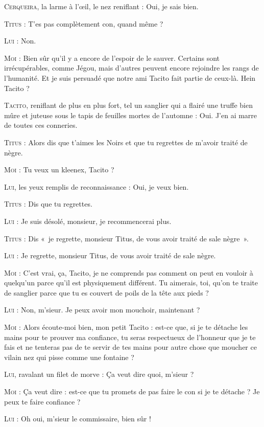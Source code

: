 \begin{dialogue}
\textsc{Cerqueira}, la larme à l’œil, le nez reniflant : Oui, je sais bien.

\textsc{Titus} : T’es pas complètement con, quand même ?

\textsc{Lui} : Non.

\textsc{Moi} : Bien sûr qu’il y a encore de l’espoir de le sauver. Certains sont irrécupérables, comme Jégou, mais d’autres peuvent encore rejoindre les rangs de l’humanité. Et je suis persuadé que notre ami Tacito fait partie de ceux-là. Hein Tacito ?

\textsc{Tacito}, reniflant de plus en plus fort, tel un sanglier qui a flairé une truffe bien mûre et juteuse sous le tapis de feuilles mortes de l’automne : Oui. J’en ai marre de toutes ces conneries.

\textsc{Titus} : Alors dis que t’aimes les Noirs et que tu regrettes de m’avoir traité de nègre.

\textsc{Moi} : Tu veux un kleenex, Tacito ?

\textsc{Lui}, les yeux remplis de reconnaissance : Oui, je veux bien.

\textsc{Titus} : Dis que tu regrettes.

\textsc{Lui} : Je suis désolé, monsieur, je recommencerai plus.

\textsc{Titus} : Dis «~je regrette, monsieur Titus, de vous avoir traité de sale nègre~».

\textsc{Lui} : Je regrette, monsieur Titus, de vous avoir traité de sale nègre.

\textsc{Moi} : C’est vrai, ça, Tacito, je ne comprends pas comment on peut en vouloir à quelqu’un parce qu’il est physiquement différent. Tu aimerais, toi, qu’on te traite de sanglier parce que tu es couvert de poils de la tête aux pieds ?

\textsc{Lui} : Non, m’sieur. Je peux avoir mon mouchoir, maintenant ?

\textsc{Moi} : Alors écoute-moi bien, mon petit Tacito : est-ce que, si je te détache les mains pour te prouver ma confiance, tu seras respectueux de l’honneur que je te fais et ne tenteras pas de te servir de tes mains pour autre chose que moucher ce vilain nez qui pisse comme une fontaine ?

\textsc{Lui}, ravalant un filet de morve : Ça veut dire quoi, m’sieur ?

\textsc{Moi} : Ça veut dire : est-ce que tu promets de pas faire le con si je te détache ? Je peux te faire confiance ?

\textsc{Lui} : Oh oui, m’sieur le commissaire, bien sûr !


\end{dialogue}
